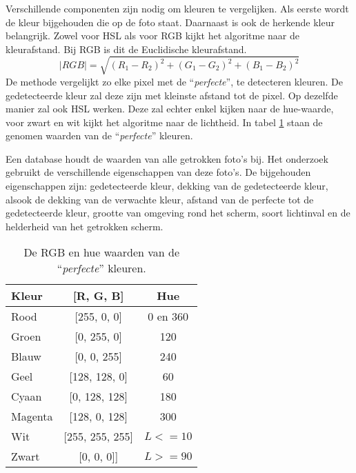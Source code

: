 Verschillende componenten zijn nodig om kleuren te vergelijken. Als eerste wordt de kleur bijgehouden die op de foto staat. Daarnaast is ook de herkende kleur belangrijk. Zowel voor HSL als voor RGB kijkt het algoritme naar de kleurafstand. Bij RGB is dit de Euclidische kleurafstand. 
$$ \mid RGB \mid = \sqrt{(R_1 - R_2)^2 + (G_1 - G_2)^2 + (B_1 - B_2)^2}$$
De methode vergelijkt zo elke pixel met de ``{\it perfecte}'', te detecteren kleuren. De gedetecteerde kleur zal deze zijn met kleinste afstand tot de pixel. Op dezelfde manier zal ook HSL werken. Deze zal echter enkel kijken naar de hue-waarde, voor zwart en wit kijkt het algoritme naar de lichtheid. In tabel \ref{tab:kleuren}  staan de genomen waarden van de ``{\it perfecte}'' kleuren.

Een database houdt de waarden van alle getrokken foto's bij. Het onderzoek gebruikt de verschillende eigenschappen van deze foto's. De bijgehouden eigenschappen zijn: gedetecteerde kleur, dekking van de gedetecteerde kleur, alsook de dekking van de verwachte kleur, afstand van de perfecte tot de gedetecteerde kleur, grootte van omgeving rond het scherm, soort lichtinval en de helderheid van het getrokken scherm.

\begin{center}
\begin{table}
\label{tab:kleuren}
\centering
\begin{tabular}{ | l | c | c | }
\hline
Kleur & [R, G, B] & Hue \\
\hline
Rood & [255, 0, 0] & 0 en 360 \\
Groen & [0, 255, 0] & 120 \\
Blauw & [0, 0, 255] & 240 \\
Geel & [128, 128, 0] & 60 \\
Cyaan & [0, 128, 128] & 180 \\
Magenta & [128, 0, 128] & 300 \\
Wit & [255, 255, 255] & $L <= 10$ \\
Zwart & [0, 0, 0]] & $L >= 90$ \\
\hline
\end{tabular}
\caption{De RGB en hue waarden van de ``{\it perfecte}'' kleuren.}
\end{table}
\end{center}